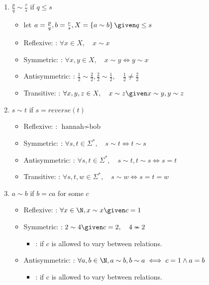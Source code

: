 \documentclass[basic, header]{nosvagor-notes}
\begin{document}
\begin{enumerate}[itemsep=5em]
\begin{enumerate}[itemsep=2.5em]
      \item $\frac p q  \sim \frac r s $ if $q \le s$
        \begin{itemize}
          \item let \(a = \frac{p}{q}, b = \frac{r}{s}, X = \left\{ a\sim b \right\}  \given q \leq s\)
          \item Reflexive: : \(\forall x \in X, \quad x \sim x\)
          \item Symmetric: : \(\forall x,y \in X, \quad x \sim y \iff y \sim x\)
          \item Antisymmetric: : \(\frac{1}{2} \sim \frac{2}{2}, \frac{2}{2} \sim \frac{1}{2}, \quad \frac{1}{2} \neq \frac{2}{2}\)
          \item Transitive: : \(\forall x,y,z \in X, \quad x \sim z \given x \sim y, y\sim z \)
        \end{itemize}

      \item $s \sim t$ if $s = reverse(t)$
        \begin{itemize}
          \item Reflexive: : \(\text{hannah} \nsim \text{bob} \)
          \item Symmetric: : \(\forall s,t \in \Sigma^*, \quad s \sim t \iff t \sim s\)
          \item Antisymmetric: : \(\forall s,t \in \Sigma^*, \quad s\sim t, t\sim s \iff s = t\)
          \item Transitive: : \(\forall s,t,w \in \Sigma^*, \quad  s \sim w \iff s = t = w\)
        \end{itemize}

      \item $a \sim b$ if $b = ca$ for some $c$
        \begin{itemize}
          \item Reflexive: : \(\forall x \in \N, x \sim x \given c = 1\)
          \item Symmetric: : \(2 \sim 4 \given c = 2, \quad 4 \nsim 2\)
            \begin{itemize}
              \item {}: if \(c\) is allowed to vary between relations.
            \end{itemize}

          \item Antisymmetric: : \(\forall a,b \in \N, a \sim b, b \sim a \iff c = 1 \land a = b\)
            \begin{itemize}
              \item {}: if c is allowed to vary between relations.
            \end{itemize}


\end{itemize}
\end{enumerate}
\end{enumerate}
\end{document}
